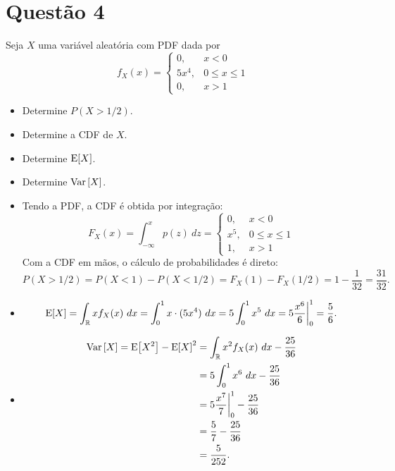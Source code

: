 \section{Questão 4}
Seja $X$ uma variável aleatória com PDF dada por
%
\begin{equation*}
    f_X(x) = 
    \begin{cases}
        0,     & x < 0 \\
        5 x^4, & 0 \leq x \leq 1 \\
        0,     & x > 1
    \end{cases}
\end{equation*}

\begin{itemize}
    \item [a)] 
    Determine $P(X > 1/2)$.
    
    \item [b)] 
    Determine a CDF de $X$.
    
    \item [c)] 
    Determine $\mathrm{E}\!\left[X\right]$.
    
    \item [d)] 
    Determine $\mathrm{Var}\left[X\right]$.
\end{itemize}

\respostas
\begin{itemize}
    \item [a), b)]
    Tendo a PDF, a CDF é obtida por integração:
    \begin{equation}
        F_X(x) = 
        \int_{-\infty}^x p(z) \ dz =
        \begin{cases}
            0,     & x < 0 \\
            x^5,   & 0 \leq x \leq 1 \\ 
            1,     & x > 1
        \end{cases}
    \end{equation}
    Com a CDF em mãos, o cálculo de probabilidades é direto:
    \begin{equation}
        P(X > 1/2) 
        = P(X < 1) - P(X < 1/2) 
        = F_X(1) - F_X(1/2)
        = 1 - \frac{1}{32}
        = \frac{31}{32}.
    \end{equation}
    
    \item [c)]
    \begin{equation}
        \mathrm{E}\!\left[X\right] 
        = \int_\mathbb{R} x f_X(x) \ dx
        = \int_0^1 x \cdot (5x^4) \ dx 
        = 5 \int_0^1 x^5 \ dx 
        = 5 \frac{x^6}{6}\bigg|_0^1 
        = \frac56.
    \end{equation}
    
    \item [d)]
    \begin{align}
        \mathrm{Var}\left[X\right] 
        = \mathrm{E}\!\left[X^2\right] - \mathrm{E}\!\left[X\right]^2 
        &= \int_\mathbb{R} x^2 f_X(x) \ dx - \frac{25}{36} \\
        &= 5 \int_0^1 x^6 \ dx - \frac{25}{36} \\
        &= 5 \frac{x^7}{7}\bigg|_0^1 - \frac{25}{36} \\
        &= \frac{5}{7} - \frac{25}{36} \\
        &= \frac{5}{252}.
    \end{align}
\end{itemize}